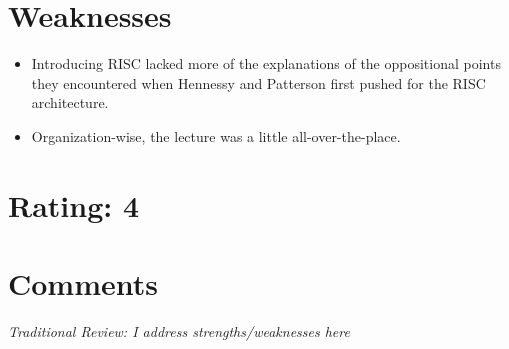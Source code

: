 \documentclass [12pt]{article}
\begin{document}

    \section{Weaknesses} %
    \label{sec:weaknesses}
        \begin{itemize}
            \item Introducing RISC lacked more of the explanations of the oppositional points they encountered when Hennessy and Patterson first pushed for the RISC architecture.
            \item Organization-wise, the lecture was a little all-over-the-place.
        \end{itemize}
    


    \section{Rating: 4} %
    \label{sec:rating}
    \pagebreak

    \section{Comments} %
    \label{sec:comments}

        \emph{Traditional Review: I address strengths/weaknesses here} \\
\end{document}
